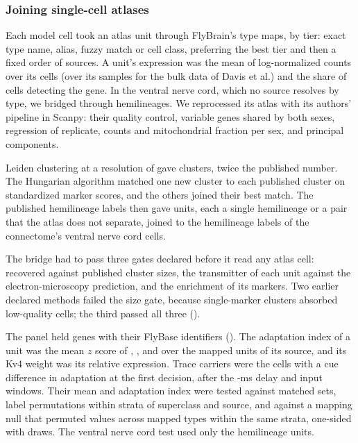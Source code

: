 \subsubsection{Joining single-cell atlases}

Each model cell took an atlas unit through FlyBrain's type maps, by tier: exact type name, alias, fuzzy match or cell class,
preferring the best tier and then a fixed order of sources. A unit's expression was the mean of log-normalized counts over its cells
(over its samples for the bulk data of Davis et al.) and the share of cells detecting the gene. In the ventral nerve cord, which no source resolves by type,
we bridged through hemilineages. We reprocessed its atlas with its authors' pipeline in Scanpy:
their quality control,  variable genes shared by both sexes, regression of replicate, counts and mitochondrial
fraction per sex, and  principal components.

Leiden clustering at a resolution of  gave  clusters, twice the published number. The
Hungarian algorithm matched one new cluster to each published cluster on standardized marker scores, and the others joined
their best match. The published hemilineage labels then gave  units, each a single hemilineage or a pair that the atlas
does not separate, joined to the hemilineage labels of the connectome's ventral nerve cord cells.

The bridge had to pass three gates declared before it read any atlas cell: recovered against published cluster sizes, the
transmitter of each unit against the electron-microscopy prediction, and the enrichment of its markers. Two earlier declared
methods failed the size gate, because single-marker clusters absorbed low-quality cells; the third passed all three
().

The panel held  genes with their FlyBase identifiers (). The adaptation index of a unit was the mean $z$
score of , ,  and  over the mapped units of its source, and its Kv4 weight was its
relative  expression. Trace carriers were the cells with a cue difference in adaptation at the first decision, after
the -ms delay and  input windows. Their mean  and adaptation index were tested against matched sets,
label permutations within strata of superclass and source, and against a mapping null that permuted values across mapped types
within the same strata, one-sided with  draws. The ventral nerve cord test used only the hemilineage units.

